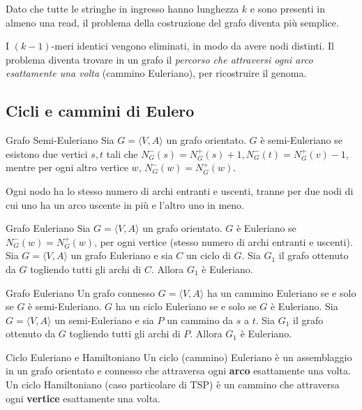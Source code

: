 Dato che tutte le stringhe in ingresso hanno lunghezza $k$ e sono presenti in almeno una read, il problema della costruzione del grafo diventa più semplice.

I $(k - 1)$-meri identici vengono eliminati, in modo da avere nodi distinti. Il problema diventa trovare in un grafo il \textit{percorso che attraversi ogni arco esattamente una volta} (cammino Euleriano), per ricostruire il genoma. 



\subsection{Cicli e cammini di Eulero}
\begin{definition}{Grafo Semi-Euleriano}{}
	Sia $G = \langle V, A \rangle$ un grafo orientato. $G$ è semi-Euleriano se esistono due vertici $s, t$ tali che $N_G^- (s) = N_G^+(s) + 1, N_G^-(t) = N_G^+(v) - 1$, mentre per ogni altro vertice $w$, $N_G^-(w) = N_G^+(w)$.
	
	Ogni nodo ha lo stesso numero di archi entranti e uscenti, tranne per due nodi di cui uno ha un arco uscente in più e l'altro uno in meno.
\end{definition}

\begin{definition}{Grafo Euleriano}{}
	Sia $G = \langle V, A \rangle $ un grafo orientato. $G$ è Euleriano se $N_G^-(w) = N_G^+(w)$, per ogni vertice (stesso numero di archi entranti e uscenti).
	\tcblower
	Sia $G = \langle V, A \rangle$ un grafo Euleriano e sia $C$ un ciclo di $G$. Sia $G_1$ il grafo ottenuto da $G$ togliendo tutti gli archi di $C$. Allora $G_1$ è Euleriano.
\end{definition}

\begin{thm}{Grafo Euleriano}{}
	Un grafo connesso $G = \langle V, A \rangle$ ha un cammino Euleriano se e solo se $G$ è semi-Euleriano. $G$ ha un ciclo Euleriano se e solo se $G$ è Euleriano.
	\tcblower
	Sia $G = \langle V, A \rangle$ un semi-Euleriano e sia $P$ un cammino da $s$ a $t$. Sia $G_1$ il grafo ottenuto da $G$ togliendo tutti gli archi di $P$. Allora $G_1$ è Euleriano.
\end{thm}

\begin{definition}{Ciclo Euleriano e Hamiltoniano}{}
	Un ciclo (cammino) Euleriano è un assemblaggio in un grafo orientato e connesso che attraversa ogni \textbf{arco} esattamente una volta.
	\tcblower
	Un ciclo Hamiltoniano (caso particolare di TSP) è un cammino che attraversa ogni \textbf{vertice} esattamente una volta.
\end{definition}

